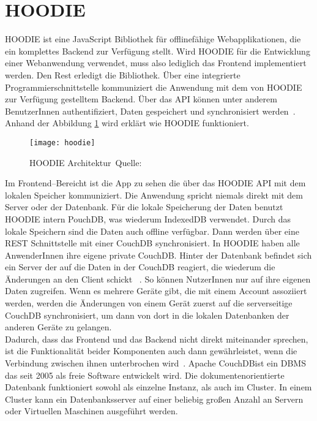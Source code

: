 \section{HOODIE}
HOODIE ist eine JavaScript Bibliothek für offlinefähige Webapplikationen, die ein komplettes Backend zur Verfügung stellt.
Wird HOODIE für die Entwicklung einer Webanwendung verwendet, muss also lediglich das Frontend implementiert werden.
Den Rest erledigt die Bibliothek. Über eine integrierte Programmierschnittstelle kommuniziert die Anwendung mit dem von HOODIE zur Verfügung gestelltem Backend.
Über das \gls{API} können unter anderem BenutzerInnen authentifiziert, Daten gespeichert und synchronisiert werden~\cite{hoodie}.\\
Anhand der Abbildung \ref{fig:hoodie} wird erklärt wie HOODIE funktioniert.
%
\begin{figure}[H]
  \centering
  \texttt{[image: hoodie]}
  \grayRule
  \caption[HOODIE Architektur]{HOODIE Architektur~Quelle:~\cite{hoodie-how}}
  \label{fig:hoodie}
\end{figure}
%
Im Frontend--Bereicht ist die App zu sehen die über das HOODIE \gls{API} mit dem lokalen Speicher kommuniziert.
Die Anwendung spricht niemals direkt mit dem Server oder der Datenbank. Für die lokale Speicherung der Daten benutzt HOODIE intern PouchDB, was wiederum IndexedDB verwendet. Durch das lokale Speichern sind die Daten auch offline verfügbar. Dann werden über eine \gls{REST} Schnittstelle mit einer CouchDB synchronisiert.
In HOODIE haben alle AnwenderInnen ihre eigene private CouchDB.
Hinter der Datenbank befindet sich ein Server der auf die Daten in der CouchDB reagiert, die wiederum die Änderungen an den Client schickt ~\cite{hoodie-how}.
So können NutzerInnen nur auf ihre eigenen Daten zugreifen. Wenn es mehrere Geräte gibt, die mit einem Account assoziiert werden, werden die Änderungen von einem Gerät zuerst auf die serverseitige CouchDB synchronisiert, um dann von dort in die lokalen Datenbanken der anderen Geräte zu gelangen.\\
Dadurch, dass das Frontend und das Backend nicht direkt miteinander sprechen, ist die Funktionalität beider Komponenten auch dann gewährleistet, wenn die Verbindung zwischen ihnen unterbrochen wird~\cite{hoodie-how}.
% 
% 
Apache CouchDB\tm ist ein \gls{DBMS} das seit 2005 als freie Software entwickelt wird. Die dokumentenorientierte Datenbank funktioniert sowohl als einzelne Instanz, als auch im Cluster. In einem Cluster kann ein Datenbanksserver auf einer beliebig großen Anzahl an Servern oder Virtuellen Maschinen ausgeführt werden.\\
